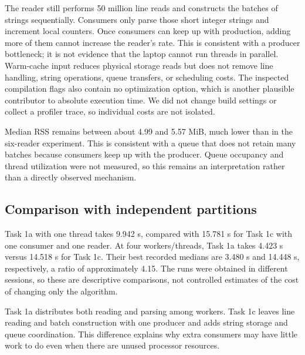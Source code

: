 \documentclass{../latex/utmreport}
\begin{document}
The reader still performs 50 million line reads and constructs the batches of
strings sequentially. Consumers only parse those short integer strings and
increment local counters. Once consumers can keep up with production, adding
more of them cannot increase the reader's rate. This is consistent with a
producer bottleneck; it is not evidence that the laptop cannot run threads
in parallel. Warm-cache input reduces physical storage reads but does not
remove line handling, string operations, queue transfers, or scheduling costs.
The inspected compilation flags also contain no optimization option, which is
another plausible contributor to absolute execution time. We did not change
build settings or collect a profiler trace, so individual costs are not isolated.

Median RSS remains between about 4.99 and 5.57 MiB, much lower than in the
six-reader experiment. This is consistent with a queue that does not retain
many batches because consumers keep up with the producer. Queue occupancy
and thread utilization were not measured, so this remains an interpretation
rather than a directly observed mechanism.

\subsection{Comparison with independent partitions}
Task 1a with one thread takes 9.942 s, compared with 15.781 s for Task 1c with
one consumer and one reader. At four workers/threads, Task 1a takes 4.423 s
versus 14.518 s for Task 1c. Their best recorded medians are 3.480 s and
14.448 s, respectively, a ratio of approximately 4.15. The runs were obtained
in different sessions, so these are descriptive comparisons, not controlled
estimates of the cost of changing only the algorithm.

Task 1a distributes both reading and parsing among workers. Task 1c leaves
line reading and batch construction with one producer and adds string storage
and queue coordination. This difference explains why extra consumers may have
little work to do even when there are unused processor resources.
\end{document}
